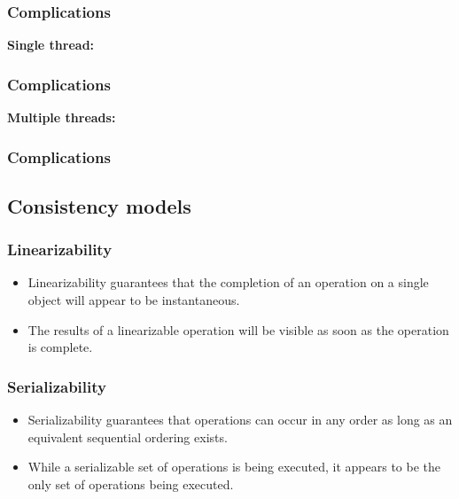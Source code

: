 \documentclass[aspectratio=1610]{beamer}
\begin{document}
  \begin{frame}
    \frametitle{Complications}
    \centering

    \textbf{Single thread:}
    \vfill
    \resizebox{0.9\linewidth}{!}{}
  \end{frame}

  \begin{frame}
    \frametitle{Complications}
    \centering

    \textbf{Multiple threads:}
    \vfill
    \resizebox{0.9\linewidth}{!}{}
  \end{frame}

  \begin{frame}
    \frametitle{Complications}

    \centering
    
  \end{frame}

  \subsection{Consistency models}

  \begin{frame}
    \frametitle{Linearizability}

    \begin{figure}
      \centering
      
    \end{figure}

    \vfill

    \begin{itemize}
      \item Linearizability guarantees that the completion of an operation on a single object will appear to be instantaneous.
      \item The results of a linearizable operation will be visible as soon as the operation is complete.
    \end{itemize}
  \end{frame}

  \begin{frame}
    \frametitle{Serializability}

    \begin{figure}
      \centering
      
    \end{figure}

    \vfill

    \begin{itemize}
      \item Serializability guarantees that operations can occur in any order as long as an equivalent sequential ordering exists.
      \item While a serializable set of operations is being executed, it appears to be the only set of operations being executed.
    \end{itemize}
  \end{frame}
\end{document}
